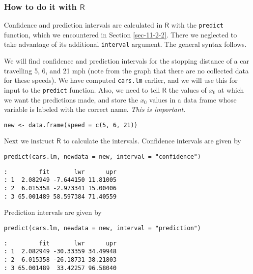 \subsubsection{How to do it with \(\mathsf{R}\)}
\label{sec-11-2-5-1}

Confidence and prediction intervals are calculated in \(\mathsf{R}\)
with the \texttt{predict}  function, which we
encountered in Section \ref{sec-11-2-2}. There we neglected to
take advantage of its additional \texttt{interval} argument. The general
syntax follows.


We will find confidence and prediction intervals for the stopping
distance of a car travelling 5, 6, and 21 mph (note from the graph
that there are no collected data for these speeds). We have computed
\texttt{cars.lm} earlier, and we will use this for input to the \texttt{predict}
function. Also, we need to tell \(\mathsf{R}\) the values of \(x_{0}\)
at which we want the predictions made, and store the \(x_{0}\) values
in a data frame whose variable is labeled with the correct name. \emph{This
is important}.

\begin{verbatim}
new <- data.frame(speed = c(5, 6, 21))
\end{verbatim}

Next we instruct \(\mathsf{R}\) to calculate the intervals. Confidence
intervals are given by

\begin{verbatim}
predict(cars.lm, newdata = new, interval = "confidence")
\end{verbatim}

\begin{verbatim}
:         fit       lwr      upr
: 1  2.082949 -7.644150 11.81005
: 2  6.015358 -2.973341 15.00406
: 3 65.001489 58.597384 71.40559
\end{verbatim}

Prediction intervals are given by

\begin{verbatim}
predict(cars.lm, newdata = new, interval = "prediction")
\end{verbatim}

\begin{verbatim}
:         fit       lwr      upr
: 1  2.082949 -30.33359 34.49948
: 2  6.015358 -26.18731 38.21803
: 3 65.001489  33.42257 96.58040
\end{verbatim}



